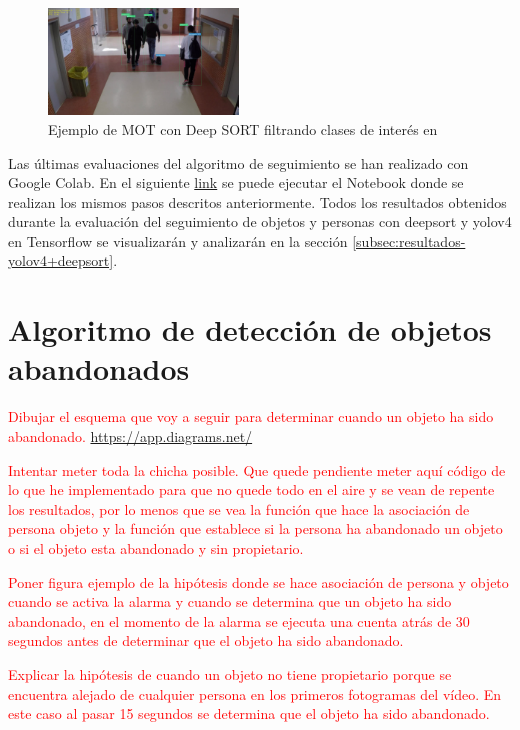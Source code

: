 \begin{figure}[ht]
\centering
\includegraphics[width=0.45\textwidth]{img/chapters/desarrollo/prueba2-deepsort-frame439.jpg}
\caption{\label{fig:prueba2-deepsort-frame439}Ejemplo de MOT con Deep SORT filtrando clases de interés en \cite{gba-dataset}}
\end{figure}

Las últimas evaluaciones del algoritmo de seguimiento se han realizado con Google Colab. En el siguiente \href{https://colab.research.google.com/drive/18vL9LH8e9VaimA9LzBD35Cn4AOm6C17I?usp=sharing}{link} se puede ejecutar el Notebook donde se realizan los mismos pasos descritos anteriormente. Todos los resultados obtenidos durante la evaluación del seguimiento de objetos y personas con \gls{deepsort} y \gls{yolov4} en Tensorflow se visualizarán y analizarán en la sección \ref{subsec:resultados-yolov4+deepsort}.

\section{Algoritmo de detección de objetos abandonados}
\label{sec:algoritmo-object-detection}

\textcolor{red}{Dibujar el esquema que voy a seguir para determinar cuando un objeto ha sido abandonado.}
\url{https://app.diagrams.net/}

\textcolor{red}{Intentar meter toda la chicha posible. Que quede pendiente meter aquí código de lo que he implementado para que no quede todo en el aire y se vean de repente los resultados, por lo menos que se vea la función que hace la asociación de persona objeto y la función que establece si la persona ha abandonado un objeto o si el objeto esta abandonado y sin propietario.}

\textcolor{red}{Poner figura ejemplo de la hipótesis donde se hace asociación de persona y objeto cuando se activa la alarma y cuando se determina que un objeto ha sido abandonado, en el momento de la alarma se ejecuta una cuenta atrás de 30 segundos antes de determinar que el objeto ha sido abandonado.}

\textcolor{red}{Explicar la hipótesis de cuando un objeto no tiene propietario porque se encuentra alejado de cualquier persona en los primeros fotogramas del vídeo. En este caso al pasar 15 segundos se determina que el objeto ha sido abandonado.}

